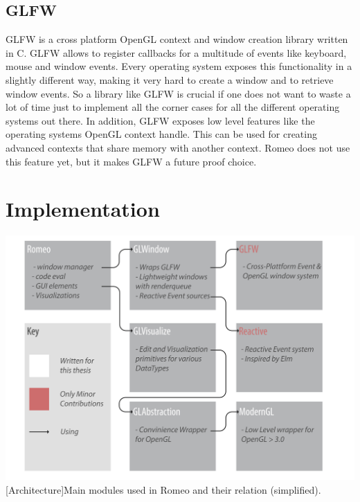 \subsection{GLFW}
GLFW\cite{GLFW} is a cross platform \ac{OpenGL} context and window creation library written in C.
GLFW allows to register callbacks for a multitude of events like keyboard, mouse and window events.
Every operating system exposes this functionality in a slightly different way, making it very hard to create a window and to retrieve window events.
So a library like GLFW is crucial if one does not want to waste a lot of time just to implement all the corner cases for all the different operating systems out there.
In addition, GLFW exposes low level features like the operating systems \ac{OpenGL} context handle.
This can be used for creating advanced contexts that share memory with another context.
Romeo does not use this feature yet, but it makes GLFW a future proof choice.


\section{Implementation}

\vspace{1em}
\begin{minipage}{\linewidth}
    \centering
    \includegraphics[width=0.9\linewidth]{graphics/architecture.pdf}
    [Architecture]{Main modules used in Romeo and their relation (simplified).}
    \label{fig:architecture} 
\end{minipage}


